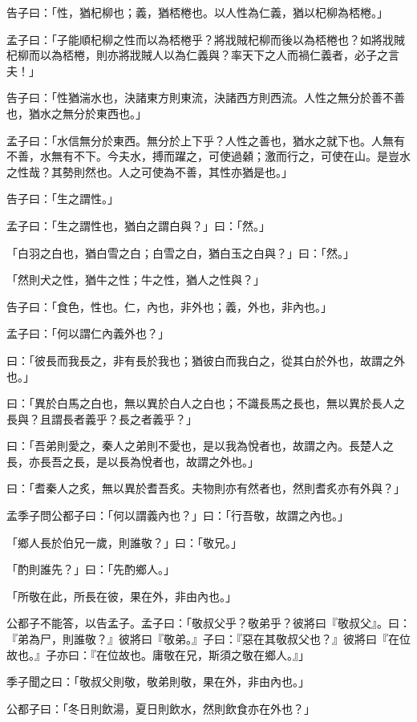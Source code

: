 
\begin{pinyinscope}
告子曰：「性，猶杞柳也；義，猶桮棬也。以人性為仁義，猶以杞柳為桮棬。」

孟子曰：「子能順杞柳之性而以為桮棬乎？將戕賊杞柳而後以為桮棬也？如將戕賊杞柳而以為桮棬，則亦將戕賊人以為仁義與？率天下之人而禍仁義者，必子之言夫！」

告子曰：「性猶湍水也，決諸東方則東流，決諸西方則西流。人性之無分於善不善也，猶水之無分於東西也。」

孟子曰：「水信無分於東西。無分於上下乎？人性之善也，猶水之就下也。人無有不善，水無有不下。今夫水，搏而躍之，可使過顙；激而行之，可使在山。是豈水之性哉？其勢則然也。人之可使為不善，其性亦猶是也。」

告子曰：「生之謂性。」

孟子曰：「生之謂性也，猶白之謂白與？」曰：「然。」

「白羽之白也，猶白雪之白；白雪之白，猶白玉之白與？」曰：「然。」

「然則犬之性，猶牛之性；牛之性，猶人之性與？」

告子曰：「食色，性也。仁，內也，非外也；義，外也，非內也。」

孟子曰：「何以謂仁內義外也？」

曰：「彼長而我長之，非有長於我也；猶彼白而我白之，從其白於外也，故謂之外也。」

曰：「異於白馬之白也，無以異於白人之白也；不識長馬之長也，無以異於長人之長與？且謂長者義乎？長之者義乎？」

曰：「吾弟則愛之，秦人之弟則不愛也，是以我為悅者也，故謂之內。長楚人之長，亦長吾之長，是以長為悅者也，故謂之外也。」

曰：「耆秦人之炙，無以異於耆吾炙。夫物則亦有然者也，然則耆炙亦有外與？」

孟季子問公都子曰：「何以謂義內也？」曰：「行吾敬，故謂之內也。」

「鄉人長於伯兄一歲，則誰敬？」曰：「敬兄。」

「酌則誰先？」曰：「先酌鄉人。」

「所敬在此，所長在彼，果在外，非由內也。」

公都子不能答，以告孟子。孟子曰：「敬叔父乎？敬弟乎？彼將曰『敬叔父』。曰：『弟為尸，則誰敬？』彼將曰『敬弟。』子曰：『惡在其敬叔父也？』彼將曰『在位故也。』子亦曰：『在位故也。庸敬在兄，斯須之敬在鄉人。』」

季子聞之曰：「敬叔父則敬，敬弟則敬，果在外，非由內也。」

公都子曰：「冬日則飲湯，夏日則飲水，然則飲食亦在外也？」


\end{pinyinscope}
